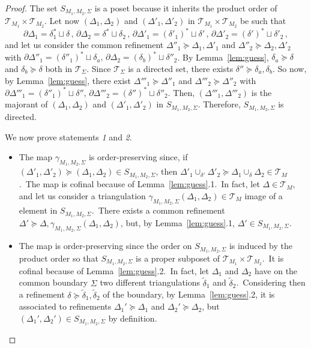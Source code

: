\documentclass[11pt]{article}
\theoremstyle{definition}
\numberwithin{equation}{section}
\begin{document}
\begin{proof}
The set $S_{M_1,M_2,\Sigma}$ is a poset because it inherits the product order of $\mathcal{T}_{M_1}\times\mathcal{T}_{M_2}$. Let now $(\Delta_1,\Delta_2)$ and $(\Delta'_1,\Delta'_2)$ in $\mathcal{T}_{M_1}\times\mathcal{T}_{M_2}$ be such that
\[\partial\Delta_1=\delta_1^*\sqcup\delta\,,\,\partial\Delta_2=\delta^*\sqcup\delta_2\,,\,\partial\Delta'_1=(\delta'_1)^*\sqcup\delta'\,,\,\partial\Delta'_2=(\delta')^*\sqcup\delta'_2\,,\]
and let us consider the common refinement $\Delta''_1\succeq\Delta_1,\Delta'_1$ and $\Delta''_2\succeq\Delta_2,\Delta'_2$ with $\partial\Delta''_1=(\delta''_1)^*\sqcup\delta_a,\,\partial\Delta_2=(\delta_b)^*\sqcup\delta''_2$. By Lemma~\ref{lem:guess}, $\delta_a\succeq\delta$ and $\delta_b\succeq \delta$ both in $\mathcal{T}_{\Sigma}$. Since $\mathcal{T}_{\Sigma}$ is a directed set, there exists $\delta''\succeq \delta_a,\delta_b$. So now, by Lemma~\ref{lem:guess}, there exist $\Delta'''_1\succeq\Delta''_1$ and $\Delta'''_2\succeq\Delta''_2$ with $\partial\Delta'''_1=(\delta''_1)^*\sqcup\delta'',\,\partial\Delta'''_2=(\delta'')^*\sqcup\delta''_2$. Then, $(\Delta'''_1,\Delta'''_2)$ is the majorant of $(\Delta_1,\Delta_2)$ and $(\Delta'_1,\Delta'_2)$ in $S_{M_1,M_2,\Sigma}$. Therefore, $S_{M_1,M_2,\Sigma}$ is directed.
\smallskip

\noindent
We now prove statements \emph{1} and \emph{2}.
\begin{itemize}
    \item[\emph{1.}] The map $\gamma_{M_1,M_2,\Sigma}$ is order-preserving since, if $(\Delta'_1,\Delta'_2)\succeq(\Delta_1,\Delta_2)\in S_{M_1,M_2,\Sigma}$, then $\Delta'_1\cup_{\delta'}\Delta'_2\succeq\Delta_1\cup_{\delta}\Delta_2\in\mathcal{T}_M$.~The map is cofinal because of Lemma~\ref{lem:guess}.1.~In fact, let $\Delta\in\mathcal{T}_M$, and let us consider a triangulation $\gamma_{M_1,M_2,\Sigma}(\Delta_1,\Delta_2)\in\mathcal{T}_M$ image of a element in $S_{M_1,M_2,\Sigma}$.~There exists a common refinement $\Delta'\succeq\Delta,\gamma_{M_1,M_2,\Sigma}(\Delta_1,\Delta_2)$, but, by Lemma~\ref{lem:guess}.1, $\Delta'\in S_{M_1,M_2,\Sigma}$.
    \item[\emph{2.}] The map is order-preserving since the order on $S_{M_1,M_2,\Sigma}$ is induced by the product order so that $S_{M_1,M_2,\Sigma}$ is a proper subposet of $\mathcal{T}_{M_1}\times\mathcal{T}_{M_2}$.~It is cofinal because of Lemma~\ref{lem:guess}.2.~In fact, let $\Delta_1$ and $\Delta_2$ have on the common boundary $\Sigma$ two different triangulations $\tilde\delta_1$ and $\tilde\delta_2$.~Considering then a refinement $\delta \succeq\tilde\delta_1,\tilde\delta_2$ of the boundary, by Lemma~\ref{lem:guess}.2, it is associated to refinements $\Delta_1'\succeq\Delta_1$ and $\Delta_2'\succeq\Delta_2$, but $(\Delta_1',\Delta_2')\in S_{M_1,M_2,\Sigma}$ by definition.
\end{itemize}
\end{proof}
\end{document}
